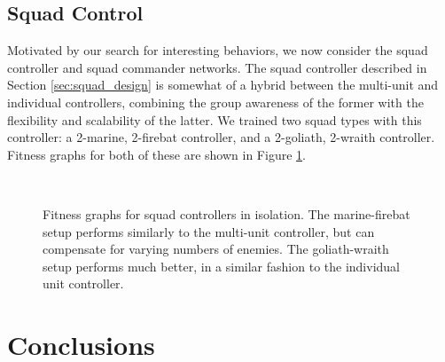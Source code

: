 \documentclass[a4paper]{article}
\begin{document}
\subsection{Squad Control}

Motivated by our search for interesting behaviors, we now consider the squad controller and squad commander networks. The squad controller described in Section \ref{sec:squad_design} is somewhat of a hybrid between the multi-unit and individual controllers, combining the group awareness of the former with the flexibility and scalability of the latter. We trained two squad types with this controller: a 2-marine, 2-firebat controller, and a 2-goliath, 2-wraith controller. Fitness graphs for both of these are shown in Figure \ref{fig:squads_individual}.

\begin{figure}
\centering
\mbox{\quad
{}}
\caption{Fitness graphs for squad controllers in isolation. The marine-firebat setup performs similarly to the multi-unit controller, but can compensate for varying numbers of enemies. The goliath-wraith setup performs much better, in a similar fashion to the individual unit controller.}
\label{fig:squads_individual}
\end{figure}

\section{Conclusions}
\label{sec:conclusion}
\end{document}
